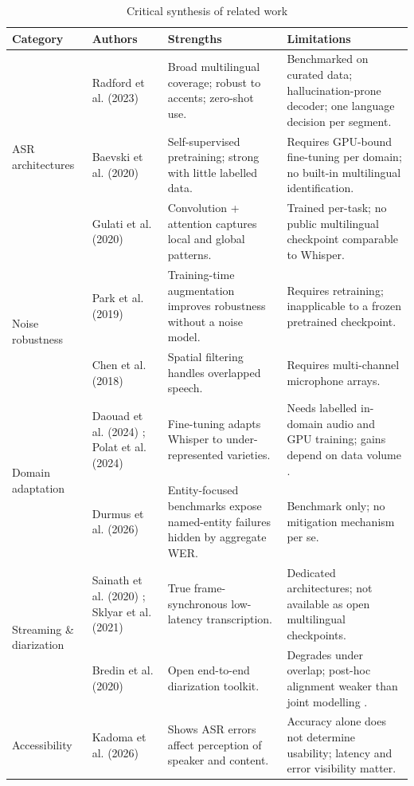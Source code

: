 \documentclass[12pt]{report}
\begin{document}
\begin{table}[htbp]
\centering
\footnotesize
\renewcommand{\arraystretch}{1.2}
\begin{tabular}{|p{2.2cm}|p{2.8cm}|p{4.4cm}|p{4.6cm}|}
\hline
\textbf{Category} & \textbf{Authors} & \textbf{Strengths} & \textbf{Limitations} \\ \hline
\multirow{3}{2.2cm}{ASR architectures}
& Radford et al. (2023) \cite{radford2023robust}
& Broad multilingual coverage; robust to accents; zero-shot use.
& Benchmarked on curated data; hallucination-prone decoder; one language decision per segment. \\ \cline{2-4}
& Baevski et al. (2020) \cite{baevski2020wav2vec}
& Self-supervised pretraining; strong with little labelled data.
& Requires GPU-bound fine-tuning per domain; no built-in multilingual identification. \\ \cline{2-4}
& Gulati et al. (2020) \cite{gulati2020conformer}
& Convolution + attention captures local and global patterns.
& Trained per-task; no public multilingual checkpoint comparable to Whisper. \\ \hline
\multirow{2}{2.2cm}{Noise robustness}
& Park et al. (2019) \cite{park2019specaugment}
& Training-time augmentation improves robustness without a noise model.
& Requires retraining; inapplicable to a frozen pretrained checkpoint. \\ \cline{2-4}
& Chen et al. (2018) \cite{chen2018multi}
& Spatial filtering handles overlapped speech.
& Requires multi-channel microphone arrays. \\ \hline
\multirow{2}{2.2cm}{Domain adaptation}
& Daouad et al. (2024) \cite{daouad2024optimizing}; Polat et al. (2024) \cite{polat2024implementation}
& Fine-tuning adapts Whisper to under-represented varieties.
& Needs labelled in-domain audio and GPU training; gains depend on data volume \cite{whisperfinetune2024}. \\ \cline{2-4}
& Durmus et al. (2026) \cite{durmus2026contextual}
& Entity-focused benchmarks expose named-entity failures hidden by aggregate WER.
& Benchmark only; no mitigation mechanism per se. \\ \hline
\multirow{2}{2.2cm}{Streaming \& diarization}
& Sainath et al. (2020) \cite{sainath2020streaming}; Sklyar et al. (2021) \cite{sklyar2021streaming}
& True frame-synchronous low-latency transcription.
& Dedicated architectures; not available as open multilingual checkpoints. \\ \cline{2-4}
& Bredin et al. (2020) \cite{bredin2020pyannote}
& Open end-to-end diarization toolkit.
& Degrades under overlap; post-hoc alignment weaker than joint modelling \cite{raj2021integration}. \\ \hline
\multirow{1}{2.2cm}{Accessibility}
& Kadoma et al. (2026) \cite{kadoma2026lost}
& Shows ASR errors affect perception of speaker and content.
& Accuracy alone does not determine usability; latency and error visibility matter. \\ \hline
\end{tabular}
\caption{Critical synthesis of related work}
\label{tab:sota_synthesis}
\end{table}
\end{document}
